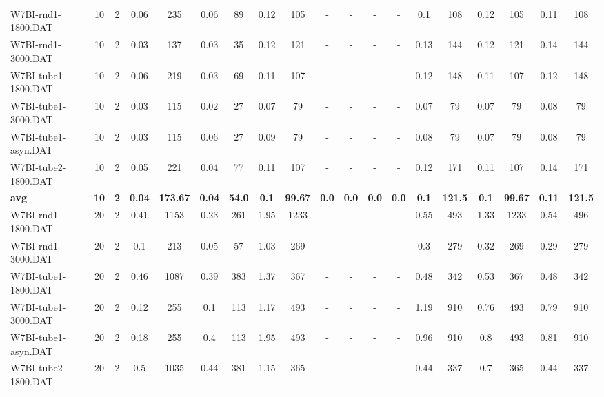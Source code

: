 \begin{sidewaystable}[!ht]
{\begin{tabular}{lcccccccccccccccccc}
W7BI-rnd1-1800.DAT & 10 & 2 &  \textcolor{blue2}{0.06} & 235 &  \textcolor{blue2}{0.06} & 89 & 0.12 & 105 &  - &  - &  - &  - & 0.1 & 108 & 0.12 & 105 & 0.11 & 108 \\
W7BI-rnd1-3000.DAT & 10 & 2 &  \textcolor{blue2}{0.03} & 137 &  \textcolor{blue2}{0.03} & 35 & 0.12 & 121 &  - &  - &  - &  - & 0.13 & 144 & 0.12 & 121 & 0.14 & 144 \\
W7BI-tube1-1800.DAT & 10 & 2 & 0.06 & 219 &  \textcolor{blue2}{0.03} & 69 & 0.11 & 107 &  - &  - &  - &  - & 0.12 & 148 & 0.11 & 107 & 0.12 & 148 \\
W7BI-tube1-3000.DAT & 10 & 2 & 0.03 & 115 &  \textcolor{blue2}{0.02} & 27 & 0.07 & 79 &  - &  - &  - &  - & 0.07 & 79 & 0.07 & 79 & 0.08 & 79 \\
W7BI-tube1-asyn.DAT & 10 & 2 &  \textcolor{blue2}{0.03} & 115 & 0.06 & 27 & 0.09 & 79 &  - &  - &  - &  - & 0.08 & 79 & 0.07 & 79 & 0.08 & 79 \\
W7BI-tube2-1800.DAT & 10 & 2 & 0.05 & 221 &  \textcolor{blue2}{0.04} & 77 & 0.11 & 107 &  - &  - &  - &  - & 0.12 & 171 & 0.11 & 107 & 0.14 & 171 \\
\cline{1-19} \textbf{avg} & \textbf{10} & \textbf{2} & \textbf{0.04} & \textbf{173.67} & \textbf{0.04} & \textbf{54.0} & \textbf{0.1} & \textbf{99.67} & \textbf{0.0} & \textbf{0.0} & \textbf{0.0} & \textbf{0.0} & \textbf{0.1} & \textbf{121.5} & \textbf{0.1} & \textbf{99.67} & \textbf{0.11} & \textbf{121.5} \\ \cline{1-19}
W7BI-rnd1-1800.DAT & 20 & 2 & 0.41 & 1153 &  \textcolor{blue2}{0.23} & 261 & 1.95 & 1233 &  - &  - &  - &  - & 0.55 & 493 & 1.33 & 1233 & 0.54 & 496 \\
W7BI-rnd1-3000.DAT & 20 & 2 & 0.1 & 213 &  \textcolor{blue2}{0.05} & 57 & 1.03 & 269 &  - &  - &  - &  - & 0.3 & 279 & 0.32 & 269 & 0.29 & 279 \\
W7BI-tube1-1800.DAT & 20 & 2 & 0.46 & 1087 &  \textcolor{blue2}{0.39} & 383 & 1.37 & 367 &  - &  - &  - &  - & 0.48 & 342 & 0.53 & 367 & 0.48 & 342 \\
W7BI-tube1-3000.DAT & 20 & 2 & 0.12 & 255 &  \textcolor{blue2}{0.1} & 113 & 1.17 & 493 &  - &  - &  - &  - & 1.19 & 910 & 0.76 & 493 & 0.79 & 910 \\
W7BI-tube1-asyn.DAT & 20 & 2 &  \textcolor{blue2}{0.18} & 255 & 0.4 & 113 & 1.95 & 493 &  - &  - &  - &  - & 0.96 & 910 & 0.8 & 493 & 0.81 & 910 \\
W7BI-tube2-1800.DAT & 20 & 2 & 0.5 & 1035 &  \textcolor{blue2}{0.44} & 381 & 1.15 & 365 &  - &  - &  - &  - &  \textcolor{blue2}{0.44} & 337 & 0.7 & 365 &  \textcolor{blue2}{0.44} & 337 \\

\end{tabular}}
\end{sidewaystable}
